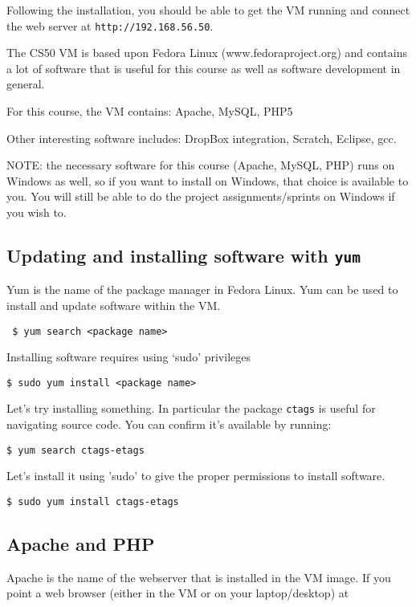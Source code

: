 \documentclass[letterpaper]{article}
\begin{document}
Following the installation, you should be able to get the VM running and
connect the web server at {\tt http://192.168.56.50}.

The CS50 VM is based upon Fedora Linux (www.fedoraproject.org) and
contains a lot of software that is useful for this course as well as
software development in general.

For this course, the VM contains: Apache, MySQL, PHP5

Other interesting software includes: DropBox integration, Scratch, Eclipse, gcc.

NOTE: the necessary software for this course (Apache, MySQL, PHP) runs on
Windows as well, so if you want to install on Windows, that choice is available
to you.  You will still be able to do the project assignments/sprints on
Windows if you wish to.

\subsection*{Updating and installing software with {\tt yum}}

Yum is the name of the package manager in Fedora Linux.  Yum can be used to
install and update software within the VM.

\verb+ $ yum search <package name> +

Installing software requires using `sudo' privileges

\begin{verbatim}
$ sudo yum install <package name>
\end{verbatim}

Let's try installing something.  In particular the package {\tt ctags} is
useful for navigating source code.  You can confirm it's available by running:

\begin{verbatim}
$ yum search ctags-etags
\end{verbatim}

Let's install it using 'sudo' to give the proper permissions to install
software.

\begin{verbatim}
$ sudo yum install ctags-etags
\end{verbatim}

\subsection*{Apache and PHP}

Apache is the name of the webserver that is installed in the VM image.  If you
point a web browser (either in the VM or on your laptop/desktop) at
\end{document}
